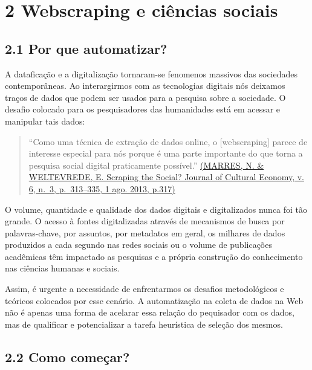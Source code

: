 \documentclass[
]{book}
\begin{document}
\hypertarget{webscraping-e-ciuxeancias-sociais}{%
\chapter{2 Webscraping e ciências sociais}\label{webscraping-e-ciuxeancias-sociais}}

\hypertarget{por-que-automatizar}{%
\section{2.1 Por que automatizar?}\label{por-que-automatizar}}

A dataficação e a digitalização tornaram-se fenomenos massivos das sociedades contemporâneas. Ao interargirmos com as tecnologias digitais nós deixamos traços de dados que podem ser usados para a pesquisa sobre a sociedade. O desafio colocado para os pesquisadores das humanidades está em acessar e manipular tais dados:

\begin{quote}
``Como uma técnica de extração de dados online, o {[}webscraping{]} parece de interesse especial para nós porque é uma parte importante do que torna a pesquisa social digital praticamente possível.'' \href{https://www.tandfonline.com/doi/abs/10.1080/17530350.2013.772070}{(MARRES, N. \& WELTEVREDE, E. Scraping the Social? Journal of Cultural Economy, v. 6, n.~3, p.~313--335, 1 ago. 2013, p.317)}
\end{quote}

O volume, quantidade e qualidade dos dados digitais e digitalizados nunca foi tão grande. O acesso à fontes digitalizadas através de mecanismos de busca por palavras-chave, por assuntos, por metadatos em geral, os milhares de dados produzidos a cada segundo nas redes sociais ou o volume de publicações acadêmicas têm impactado as pesquisas e a própria construção do conhecimento nas ciências humanas e sociais.

Assim, é urgente a necessidade de enfrentarmos os desafios metodológicos e teóricos colocados por esse cenário. A automatização na coleta de dados na Web não é apenas uma forma de acelarar essa relação do pequisador com os dados, mas de qualificar e potencializar a tarefa heurística de seleção dos mesmos.

\hypertarget{como-comeuxe7ar}{%
\section{2.2 Como começar?}\label{como-comeuxe7ar}}
\end{document}
